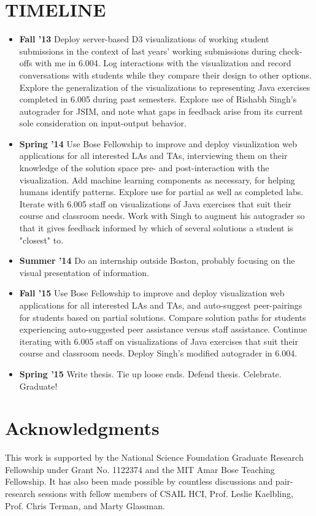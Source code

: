 \documentclass[12pt]{article}
\begin{document}
\section{TIMELINE}

\begin{itemize}
\item {\bf Fall '13} Deploy server-based D3 visualizations of working student submissions in the context of last years' working submissions during check-offs with me in 6.004. Log interactions with the visualization and record conversations with students while they compare their design to other options. Explore the generalization of the visualizations to representing Java exercises completed in 6.005 during past semesters. Explore use of Rishabh Singh's autograder for JSIM, and note what gaps in feedback arise from its current sole consideration on input-output behavior.
\item {\bf Spring '14} Use Bose Fellowship to improve and deploy visualization web applications for all interested LAs and TAs, interviewing them on their knowledge of the solution space pre- and post-interaction with the visualization. Add machine learning components as necessary, for helping humans identify patterns. Explore use for partial as well as completed labs. Iterate with 6.005 staff on visualizations of Java exercises that suit their course and classroom needs. Work with Singh to augment his autograder so that it gives feedback informed by which of several solutions a student is "closest" to.
\item {\bf Summer '14} Do an internship outside Boston, probably focusing on the visual presentation of information.
\item {\bf Fall '15} Use Bose Fellowship to improve and deploy visualization web applications for all interested LAs and TAs, and auto-suggest peer-pairings for students based on partial solutions. Compare solution paths for students experiencing auto-suggested peer assistance versus staff assistance. Continue iterating with 6.005 staff on visualizations of Java exercises that suit their course and classroom needs. Deploy Singh's modified autograder in 6.004.
\item {\bf Spring '15} Write thesis. Tie up loose ends. Defend thesis. Celebrate. Graduate!
\end{itemize}

\section{Acknowledgments}
This work is supported by the National Science Foundation Graduate Research Fellowship under Grant No. 1122374 and the MIT Amar Bose Teaching Fellowship. It has also been made possible by countless discussions and pair-research sessions with fellow members of CSAIL HCI, Prof. Leslie Kaelbling, Prof. Chris Terman, and Marty Glassman.
\end{document}
